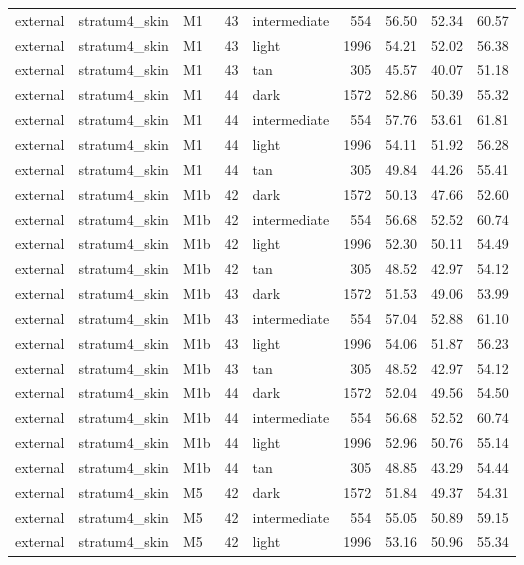 \begin{tabular}{lllrlrrrr}
external & stratum4\_skin & M1 & 43 & intermediate & 554 & 56.50 & 52.34 & 60.57 \\
external & stratum4\_skin & M1 & 43 & light & 1996 & 54.21 & 52.02 & 56.38 \\
external & stratum4\_skin & M1 & 43 & tan & 305 & 45.57 & 40.07 & 51.18 \\
external & stratum4\_skin & M1 & 44 & dark & 1572 & 52.86 & 50.39 & 55.32 \\
external & stratum4\_skin & M1 & 44 & intermediate & 554 & 57.76 & 53.61 & 61.81 \\
external & stratum4\_skin & M1 & 44 & light & 1996 & 54.11 & 51.92 & 56.28 \\
external & stratum4\_skin & M1 & 44 & tan & 305 & 49.84 & 44.26 & 55.41 \\
external & stratum4\_skin & M1b & 42 & dark & 1572 & 50.13 & 47.66 & 52.60 \\
external & stratum4\_skin & M1b & 42 & intermediate & 554 & 56.68 & 52.52 & 60.74 \\
external & stratum4\_skin & M1b & 42 & light & 1996 & 52.30 & 50.11 & 54.49 \\
external & stratum4\_skin & M1b & 42 & tan & 305 & 48.52 & 42.97 & 54.12 \\
external & stratum4\_skin & M1b & 43 & dark & 1572 & 51.53 & 49.06 & 53.99 \\
external & stratum4\_skin & M1b & 43 & intermediate & 554 & 57.04 & 52.88 & 61.10 \\
external & stratum4\_skin & M1b & 43 & light & 1996 & 54.06 & 51.87 & 56.23 \\
external & stratum4\_skin & M1b & 43 & tan & 305 & 48.52 & 42.97 & 54.12 \\
external & stratum4\_skin & M1b & 44 & dark & 1572 & 52.04 & 49.56 & 54.50 \\
external & stratum4\_skin & M1b & 44 & intermediate & 554 & 56.68 & 52.52 & 60.74 \\
external & stratum4\_skin & M1b & 44 & light & 1996 & 52.96 & 50.76 & 55.14 \\
external & stratum4\_skin & M1b & 44 & tan & 305 & 48.85 & 43.29 & 54.44 \\
external & stratum4\_skin & M5 & 42 & dark & 1572 & 51.84 & 49.37 & 54.31 \\
external & stratum4\_skin & M5 & 42 & intermediate & 554 & 55.05 & 50.89 & 59.15 \\
external & stratum4\_skin & M5 & 42 & light & 1996 & 53.16 & 50.96 & 55.34 \\

\end{tabular}
